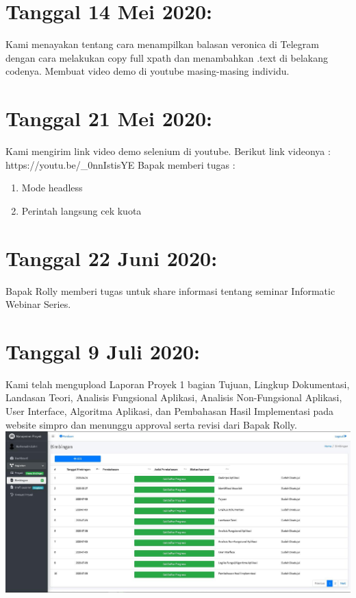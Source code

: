 \documentclass{article}
\newcounter{saveenumi}
\newcommand{\seti}{\setcounter{saveenumi}{\value{enumi}}} %
\begin{document}
\section{Tanggal 14 Mei 2020:}
Kami menayakan tentang cara menampilkan balasan veronica di Telegram dengan cara melakukan copy full xpath dan menambahkan .text di belakang codenya.
Membuat video demo di youtube masing-masing individu.
	\newline
	\newline


\section{Tanggal 21 Mei 2020:}
Kami mengirim link video demo selenium di youtube. Berikut link videonya :
https://youtu.be/\_0nnIstisYE
	\newline
	Bapak memberi tugas :
	\begin{enumerate}
		\item Mode headless
		\newline
		\item Perintah langsung cek kuota 
		\newline
		\seti %
	\end{enumerate}
	
\section{Tanggal 22 Juni 2020:}
Bapak Rolly memberi tugas untuk share informasi tentang seminar Informatic Webinar Series.
	\newline
	\newline

\section{Tanggal 9 Juli 2020:}
Kami telah mengupload Laporan Proyek 1 bagian Tujuan, Lingkup Dokumentasi, Landasan Teori, Analisis Fungsional Aplikasi, Analisis Non-Fungsional Aplikasi, User Interface, Algoritma Aplikasi, dan Pembahasan Hasil Implementasi pada website simpro dan menunggu approval serta revisi dari Bapak Rolly.
	\newline
	\includegraphics[scale=0.4]{5.jpg}
	\newline
\end{document}
